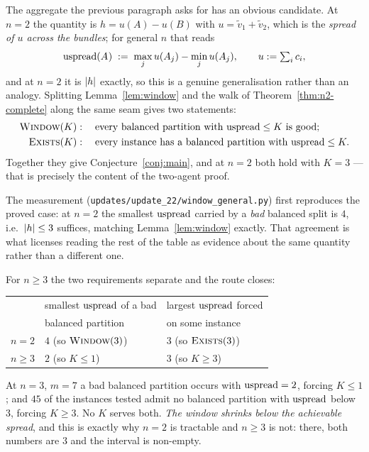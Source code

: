 The aggregate the previous paragraph asks for has an obvious candidate. At
$n = 2$ the quantity is $h = u(A) - u(B)$ with $u = \tilde{v}_1 + \tilde{v}_2$,
which is the \emph{spread of $u$ across the bundles}; for general $n$ that reads
\[
  \mathrm{uspread}(A_{}) \;:=\; \max_j u(A_{j}) - \min_j u(A_{j}),
  \qquad u := \textstyle\sum_i c_i ,
\]
and at $n = 2$ it is $\left\lvert h\right\rvert$ exactly, so this is a genuine generalisation
rather than an analogy. Splitting Lemma~\ref{lem:window} and the walk of
Theorem~\ref{thm:n2-complete} along the same seam gives two statements:
\begin{align*}
  \textsc{Window}(K) &: \quad \text{every balanced partition with }
    \mathrm{uspread} \le K \text{ is good;} \\
  \textsc{Exists}(K) &: \quad \text{every instance has a balanced partition with }
    \mathrm{uspread} \le K .
\end{align*}
Together they give Conjecture~\ref{conj:main}, and at $n = 2$ both hold with
$K = 3$ --- that is precisely the content of the two-agent proof.

The measurement (\texttt{updates/update\_22/window\_general.py}) first reproduces the
proved case: at $n = 2$ the smallest $\mathrm{uspread}$ carried by a \emph{bad} balanced
split is $4$, i.e.\ $\left\lvert h\right\rvert \le 3$ suffices, matching Lemma~\ref{lem:window}
exactly. That agreement is what licenses reading the rest of the table as
evidence about the same quantity rather than a different one.

For $n \ge 3$ the two requirements separate and the route closes:

\begin{center}
\begin{tabular}{lll}
\toprule
 & smallest $\mathrm{uspread}$ of a bad & largest $\mathrm{uspread}$ forced \\
 & balanced partition & on some instance \\
\midrule
$n = 2$      & $4$ \quad(so $\textsc{Window}(3)$) & $3$ \quad(so $\textsc{Exists}(3)$) \\
$n \ge 3$    & $2$ \quad(so $K \le 1$)            & $3$ \quad(so $K \ge 3$) \\
\bottomrule
\end{tabular}
\end{center}

At $n = 3$, $m = 7$ a bad balanced partition occurs with $\mathrm{uspread} = 2$, forcing
$K \le 1$; and $45$ of the instances tested admit no balanced partition with
$\mathrm{uspread}$ below $3$, forcing $K \ge 3$. No $K$ serves both. \emph{The window
shrinks below the achievable spread}, and this is exactly why $n = 2$ is
tractable and $n \ge 3$ is not: there, both numbers are $3$ and the interval is
non-empty.

